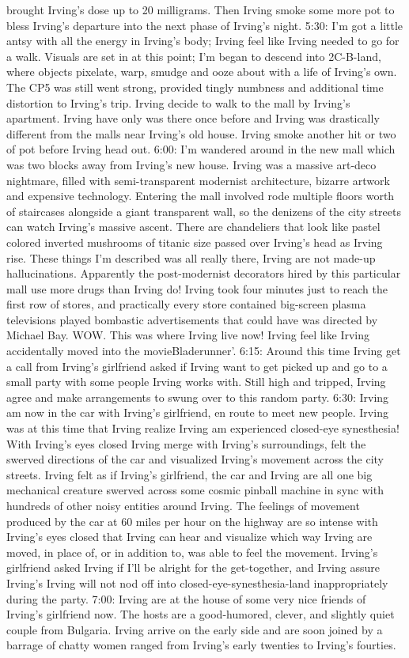 \documentclass[12pt]{book}
\begin{document}
brought Irving's dose up to 20 milligrams. Then Irving smoke some more pot to bless Irving's departure into the next phase of Irving's night. 5:30: I'm got a little antsy with all the energy in Irving's body; Irving feel like Irving needed to go for a walk. Visuals are set in at this point; I'm began to descend into 2C-B-land, where objects pixelate, warp, smudge and ooze about with a life of Irving's own. The CP5 was still went strong, provided tingly numbness and additional time distortion to Irving's trip. Irving decide to walk to the mall by Irving's apartment. Irving have only was there once before and Irving was drastically different from the malls near Irving's old house. Irving smoke another hit or two of pot before Irving head out. 6:00: I'm wandered around in the new mall which was two blocks away from Irving's new house. Irving was a massive art-deco nightmare, filled with semi-transparent modernist architecture, bizarre artwork and expensive technology. Entering the mall involved rode multiple floors worth of staircases alongside a giant transparent wall, so the denizens of the city streets can watch Irving's massive ascent. There are chandeliers that look like pastel colored inverted mushrooms of titanic size passed over Irving's head as Irving rise. These things I'm described was all really there, Irving are not made-up hallucinations. Apparently the post-modernist decorators hired by this particular mall use more drugs than Irving do! Irving took four minutes just to reach the first row of stores, and practically every store contained big-screen plasma televisions played bombastic advertisements that could have was directed by Michael Bay. WOW. This was where Irving live now! Irving feel like Irving accidentally moved into the movieBladerunner'. 6:15: Around this time Irving get a call from Irving's girlfriend asked if Irving want to get picked up and go to a small party with some people Irving works with. Still high and tripped, Irving agree and make arrangements to swung over to this random party. 6:30: Irving am now in the car with Irving's girlfriend, en route to meet new people. Irving was at this time that Irving realize Irving am experienced closed-eye synesthesia! With Irving's eyes closed Irving merge with Irving's surroundings, felt the swerved directions of the car and visualized Irving's movement across the city streets. Irving felt as if Irving's girlfriend, the car and Irving are all one big mechanical creature swerved across some cosmic pinball machine in sync with hundreds of other noisy entities around Irving. The feelings of movement produced by the car at 60 miles per hour on the highway are so intense with Irving's eyes closed that Irving can hear and visualize which way Irving are moved, in place of, or in addition to, was able to feel the movement. Irving's girlfriend asked Irving if I'll be alright for the get-together, and Irving assure Irving's Irving will not nod off into closed-eye-synesthesia-land inappropriately during the party. 7:00: Irving are at the house of some very nice friends of Irving's girlfriend now. The hosts are a good-humored, clever, and slightly quiet couple from Bulgaria. Irving arrive on the early side and are soon joined by a barrage of chatty women ranged from Irving's early twenties to Irving's fourties. 
\end{document}
